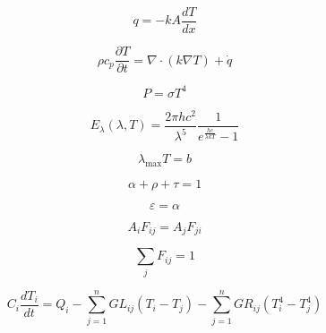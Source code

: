 \begin{equation} \label{eq:01}
    q = -kA \frac{dT}{dx}
\end{equation}

\begin{equation} \label{eq:02}
    \rho c_p \frac{\partial T}{\partial t} = \nabla \cdot (k \nabla T) + \dot{q} 
\end{equation}

\begin{equation}
    P = \sigma T^{4}
\end{equation}

\begin{equation}
    E_{\lambda}(\lambda, T) = 
\frac{2\pi h c^{2}}{\lambda^{5}} 
\frac{1}{e^{\frac{hc}{\lambda k T}} - 1}
\end{equation}

\begin{equation}
    \lambda_{\text{max}} T = b
\end{equation}

\begin{equation}
    \alpha + \rho + \tau = 1
\end{equation}

\begin{equation}
    \varepsilon = \alpha
\end{equation}

\begin{equation}
    A_i F_{ij} = A_j F_{ji}
\end{equation}

\begin{equation}
    \sum_{j} F_{ij} = 1
\end{equation}

\begin{equation}
    C_i \frac{dT_i}{dt} = Q_i - \sum_{j=1}^{n} GL_{ij}(T_i - T_j) - \sum_{j=1}^{n} GR_{ij}(T_i^4 - T_j^4)
\end{equation}

